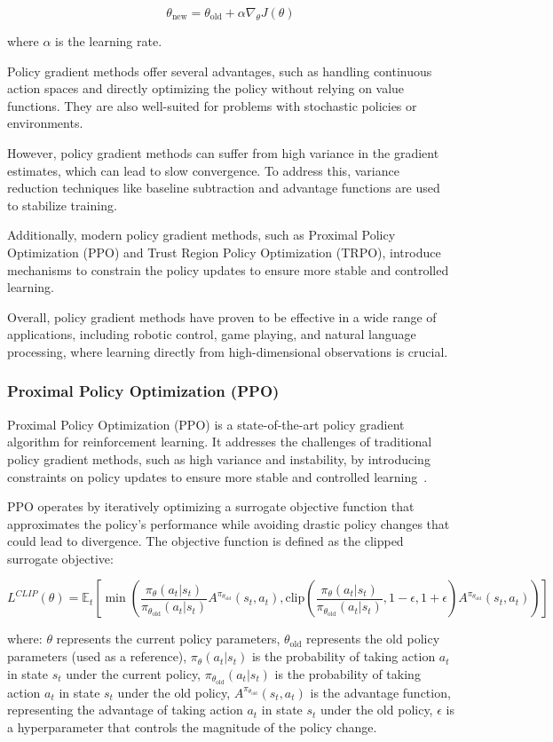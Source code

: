 \[\theta_{\text{new}} = \theta_{\text{old}} + \alpha \nabla_{\theta} J(\theta)\]

where \(\alpha\) is the learning rate.

Policy gradient methods offer several advantages, such as handling continuous action spaces and directly optimizing the policy without relying on value functions. They are also well-suited for problems with stochastic policies or environments.

However, policy gradient methods can suffer from high variance in the gradient estimates, which can lead to slow convergence. To address this, variance reduction techniques like baseline subtraction and advantage functions are used to stabilize training.

Additionally, modern policy gradient methods, such as Proximal Policy Optimization (PPO) and Trust Region Policy Optimization (TRPO), introduce mechanisms to constrain the policy updates to ensure more stable and controlled learning.

Overall, policy gradient methods have proven to be effective in a wide range of applications, including robotic control, game playing, and natural language processing, where learning directly from high-dimensional observations is crucial.

\subsubsection{Proximal Policy Optimization (PPO)}
Proximal Policy Optimization (PPO) is a state-of-the-art policy gradient algorithm for reinforcement learning. It addresses the challenges of traditional policy gradient methods, such as high variance and instability, by introducing constraints on policy updates to ensure more stable and controlled learning~\cite{schulman2017proximal}.

PPO operates by iteratively optimizing a surrogate objective function that approximates the policy's performance while avoiding drastic policy changes that could lead to divergence. The objective function is defined as the clipped surrogate objective:

\[L^{CLIP}(\theta) = \mathbb{E}_{t} \left[ \min \left( \frac{\pi_{\theta}(a_t|s_t)}{\pi_{\theta_{\text{old}}}(a_t|s_t)} A^{\pi_{\theta_{\text{old}}}}(s_t, a_t), \text{clip}\left( \frac{\pi_{\theta}(a_t|s_t)}{\pi_{\theta_{\text{old}}}(a_t|s_t)}, 1-\epsilon, 1+\epsilon \right) A^{\pi_{\theta_{\text{old}}}}(s_t, a_t) \right) \right]\]

where:
\(\theta\) represents the current policy parameters,
\(\theta_{\text{old}}\) represents the old policy parameters (used as a reference),
\(\pi_{\theta}(a_t|s_t)\) is the probability of taking action \(a_t\) in state \(s_t\) under the current policy,
\(\pi_{\theta_{\text{old}}}(a_t|s_t)\) is the probability of taking action \(a_t\) in state \(s_t\) under the old policy,
\(A^{\pi_{\theta_{\text{old}}}}(s_t, a_t)\) is the advantage function, representing the advantage of taking action \(a_t\) in state \(s_t\) under the old policy,
\(\epsilon\) is a hyperparameter that controls the magnitude of the policy change.

